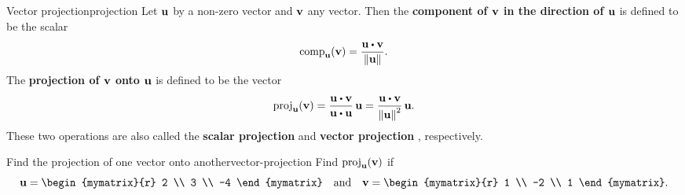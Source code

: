 \begin{definition}{Vector projection}{projection}
  Let $\vect{u}$ by a non-zero vector and $\vect{v}$ any vector. Then
  the \textbf{component of $\vect{v}$ in the direction of $\vect{u}$}%
   is defined to be the scalar
  \begin{equation*}
    \comp_{\vect{u}}(\vect{v})
    = \frac{\vect{u}\dotprod \vect{v}}{\norm{\vect{u}}}.
  \end{equation*}
  The \textbf{projection of $\vect{v}$ onto $\vect{u}$}%
   is defined to be the vector
  \begin{equation*}
    \proj_{\vect{u}}(\vect{v}) =
      \frac{\vect{u}\dotprod \vect{v}}{\vect{u}\dotprod \vect{u}}\, \vect{u}
    =
    \frac{\vect{u}\dotprod \vect{v}}{\norm{\vect{u}} ^{2}}\,\vect{u}.
  \end{equation*}
  These two operations are also called the \textbf{scalar projection}%
   and \textbf{vector projection}%
  , respectively.
\end{definition}

\begin{example}{Find the projection of one vector onto another}{vector-projection}
  Find $\proj_{\vect{u}}(\vect{v})$ if
  \begin{equation*}
    \vect{u}=
    \begin{mymatrix}{r}
      2 \\
      3 \\
      -4
    \end{mymatrix}
    \quad\mbox{and}\quad
    \vect{v}=
    \begin{mymatrix}{r}
      1 \\
      -2 \\
      1
    \end{mymatrix}.
  \end{equation*}
\end{example}

